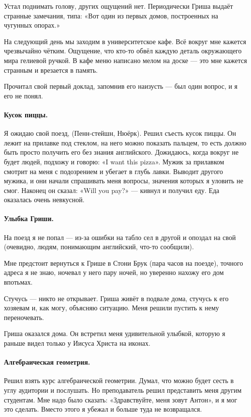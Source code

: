 \documentclass{book}
\begin{document}
Устал поднимать голову, других ощущений нет.
Периодически Гриша выдаёт странные замечания, типа: «Вот один из первых домов, построенных на чугунных опорах.»

На следующий день мы заходим в университетское кафе.
Всё вокруг мне кажется чрезвычайно чётким.
Ощущение, что кто-то обвёл каждую деталь окружающего мира гелиевой ручкой.
В кафе меню написано мелом на доске --- это мне кажется странным и врезается в память.

Прочитал свой первый доклад, запомнив его наизусть --- был один вопрос, и я его не понял.

\paragraph{Кусок пиццы.}
Я ожидаю свой поезд, (Пенн-стейшн, Нюёрк).
Решил съесть кусок пиццы.
Он лежит на прилавке под стеклом, на него можно показать пальцем, то есть должно быть просто получить его без знания английского.
Дожидаюсь, когда вокруг не будет людей, подхожу и говорю: «I want this pizza».
Мужик за прилавком смотрит на меня с подозрением и убегает в глубь лавки.
Выводит другого мужика, и они начали спрашивать меня вопросы, значения которых я уловить не смог.
Наконец он сказал: «Will you pay?» --- кивнул и получил еду.
Еда оказалась очень невкусной.

\paragraph{Улыбка Гриши.}
На поезд я не попал --- из-за ошибки на табло сел в другой и опоздал на свой (очевидно, людям, понимающим английский, что-то сообщили).

Мне предстоит вернуться к Грише в Стони Брук (пара часов на поезде), точного адреса я не знаю, ночевал у него пару ночей, но уверенно нахожу его дом впотьмах.

Стучусь --- никто не открывает.
Гриша живёт в подвале дома, стучусь к его хозяевам и, как могу, объясняю ситуацию.
Меня решили пустить к нему переночевать.

Гриша оказался дома.
Он встретил меня удивительной улыбкой, которую я раньше видел только у Иисуса Христа на иконах.

\paragraph{Алгебраическая геометрия.}
Решил взять курс алгебраической геометрии.
Думал, что можно будет сесть в углу аудитории и послушать.
Но преподаватель решил представить меня другим студентам.
Мне надо было сказать: «Здравствуйте, меня зовут Антон», и я мог это сделать.
Вместо этого я убежал и больше туда не возвращался.
\end{document}
